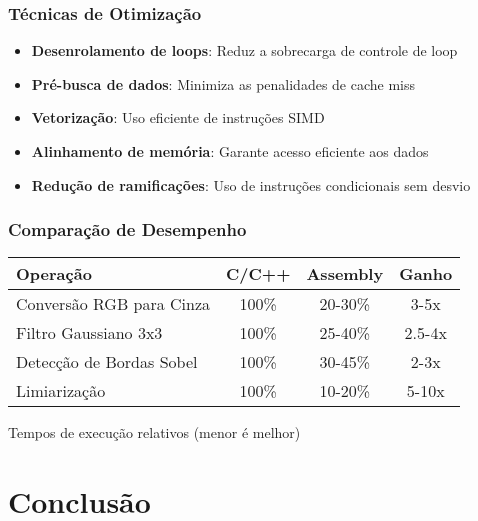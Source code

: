 \documentclass[11pt]{beamer}
\begin{document}
\begin{frame}
\frametitle{Técnicas de Otimização}

\begin{itemize}
    \item \textbf{Desenrolamento de loops}: Reduz a sobrecarga de controle de loop
    \item \textbf{Pré-busca de dados}: Minimiza as penalidades de cache miss
    \item \textbf{Vetorização}: Uso eficiente de instruções SIMD
    \item \textbf{Alinhamento de memória}: Garante acesso eficiente aos dados
    \item \textbf{Redução de ramificações}: Uso de instruções condicionais sem desvio
\end{itemize}

\end{frame}

\begin{frame}
\frametitle{Comparação de Desempenho}

\begin{center}
\begin{tabular}{|l|c|c|c|}
\hline
\textbf{Operação} & \textbf{C/C++} & \textbf{Assembly} & \textbf{Ganho} \\
\hline
Conversão RGB para Cinza & 100\% & 20-30\% & 3-5x \\
\hline
Filtro Gaussiano 3x3 & 100\% & 25-40\% & 2.5-4x \\
\hline
Detecção de Bordas Sobel & 100\% & 30-45\% & 2-3x \\
\hline
Limiarização & 100\% & 10-20\% & 5-10x \\
\hline
\end{tabular}
\end{center}

\small{Tempos de execução relativos (menor é melhor)}

\end{frame}

\section{Conclusão}
\end{document}
